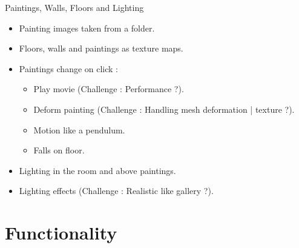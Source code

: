 \documentclass[color=usenames,dvipsnames]{beamer}
\begin{document}
\begin{frame}{Paintings, Walls, Floors and Lighting}

\begin{itemize}
\setlength{\itemsep}{15pt}  

\item Painting images taken from a folder.
\item Floors, walls and paintings as texture maps.
\item Paintings change on click : 

\begin{itemize}
\setlength{\itemsep}{5pt}  

\item Play movie (Challenge : Performance ?).
\item Deform painting (Challenge : Handling mesh deformation | texture ?).
\item Motion like a pendulum.
\item Falls on floor.

\end{itemize}

\item Lighting in the room and above paintings.
\item Lighting effects (Challenge : Realistic like gallery ?).

\end{itemize}
\end{frame}

\section{Functionality}
\end{document}
